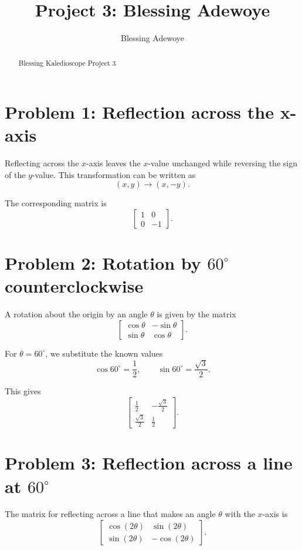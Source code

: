 \documentclass{ximera}
\title{Project 3: Blessing Adewoye}
\author{Blessing Adewoye}
\begin{document}
\begin{abstract}
    Blessing Kaledioscope Project 3
\end{abstract}
\maketitle


\section*{Problem 1: Reflection across the x-axis}

Reflecting across the $x$-axis leaves the $x$-value unchanged while reversing the sign of the $y$-value.  
This transformation can be written as
\[
(x,y) \rightarrow (x,-y).
\]

The corresponding matrix is
\[
\begin{bmatrix}
1 & 0 \\
0 & -1
\end{bmatrix}.
\]

\section*{Problem 2: Rotation by $60^\circ$ counterclockwise}

A rotation about the origin by an angle $\theta$ is given by the matrix
\[
\begin{bmatrix}
\cos \theta & -\sin \theta \\
\sin \theta & \cos \theta
\end{bmatrix}.
\]

For $\theta = 60^\circ$, we substitute the known values
\[
\cos 60^\circ = \frac{1}{2}, \qquad \sin 60^\circ = \frac{\sqrt{3}}{2}.
\]

This gives
\[
\begin{bmatrix}
\frac{1}{2} & -\frac{\sqrt{3}}{2} \\
\frac{\sqrt{3}}{2} & \frac{1}{2}
\end{bmatrix}.
\]

\section*{Problem 3: Reflection across a line at $60^\circ$}

The matrix for reflecting across a line that makes an angle $\theta$ with the $x$-axis is
\[
\begin{bmatrix}
\cos(2\theta) & \sin(2\theta) \\
\sin(2\theta) & -\cos(2\theta)
\end{bmatrix}.
\]
\end{document}
